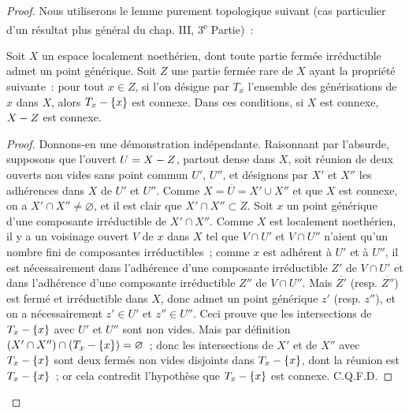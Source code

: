 \begin{proof}
Nous utiliserons le lemme purement topologique suivant (cas particulier d'un résultat plus général du chap. III, 3\textsuperscript{e} Partie)~:
\begin{lemma}[15.5.6.1]
\label{IV.15.5.6.1-fr}
Soit $X$ un espace localement noethérien, dont toute partie fermée irréductible admet un point générique. Soit $Z$ une partie fermée rare de $X$ ayant la propriété suivante~: pour tout $x\in Z$, si l'on désigne par $T_x$ l'ensemble des générisations de $x$ dans $X$, alors $T_x-\{x\}$ est connexe. Dans ces conditions, si $X$ est connexe, $X- Z$ est connexe.
\end{lemma}

\begin{proof}
Donnons-en une démonstration indépendante. Raisonnant par l'absurde, supposons que l'ouvert $U=X- Z$, partout dense dans $X$, soit réunion de deux ouverts non vides sans point commun $U'$, $U''$, et désignons par $X'$ et $X''$ les adhérences dans $X$ de $U'$ et $U''$. Comme $X=\overline{U}=X'\cup X''$ et que $X$ est connexe, on a $X'\cap X''\ne\varnothing$, et il est clair que $X'\cap X''\subset Z$. Soit $x$ un point générique d'une composante irréductible de $X'\cap X''$. Comme $X$ est localement noethérien, il y a un voisinage ouvert $V$ de $x$ dans $X$ tel que $V\cap U'$ et $V\cap U''$ n'aient qu'un nombre fini de composantes irréductibles~; comme $x$ est adhérent à $U'$ et à $U''$, il est nécessairement dans l'adhérence d'une composante irréductible $Z'$ de $V\cap U'$ et dans l'adhérence d'une composante irréductible $Z''$ de $V\cap U''$. Mais $\overline{Z'}$ (resp. $\overline{Z''}$) est fermé et irréductible dans $X$, donc admet un point générique $z'$ (resp. $z''$), et on a nécessairement $z'\in U'$ et $z''\in U''$. Ceci prouve que les intersections de $T_x-\{x\}$ avec $U'$ et $U''$ sont non vides. Mais par définition $(X'\cap X'')\cap(T_x-\{x\})=\varnothing$~; donc les intersections de $X'$ et de $X''$ avec $T_x-\{x\}$ sont deux fermés non vides disjoints dans $T_x-\{x\}$, dont la réunion est $T_x-\{x\}$~; or cela contredit l'hypothèse que $T_x-\{x\}$ est connexe. C.Q.F.D.
\end{proof}

\end{proof}
